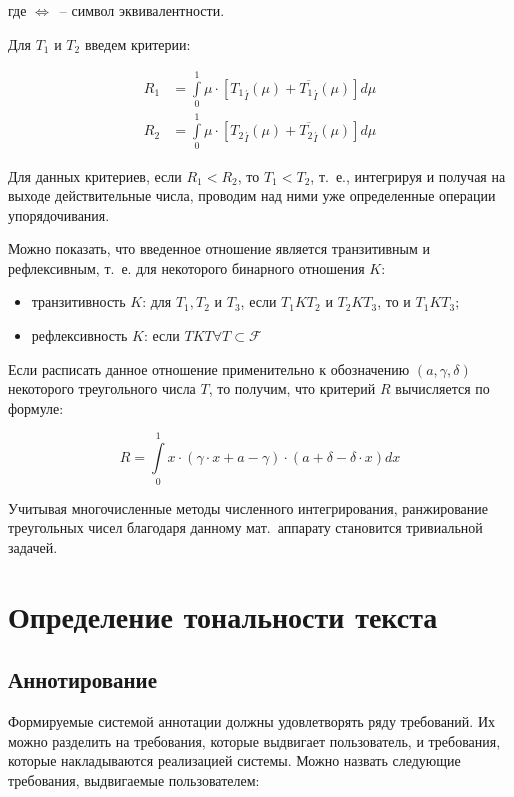 \documentclass[a4paper,14pt,russian]{extreport}
\begin{document}
где $\Leftrightarrow$~-- символ эквивалентности.

Для $T_1$ и $T_2$ введем критерии:

\begin{equation}
\begin{aligned}
R_1 &= \int\limits_0^1 \mu\cdot\left[{T_1}_{\stackrel{'}I}\left(\mu\right)+\overline{{T_1}_{\stackrel{'}I}}\left(\mu\right)\right] d\mu \\
R_2 &= \int\limits_0^1 \mu\cdot\left[{T_2}_{\stackrel{'}I}\left(\mu\right)+\overline{{T_2}_{\stackrel{'}I}}\left(\mu\right)\right] d\mu
\end{aligned}
\end{equation}

Для данных критериев, если $R_1<R_2$, то $T_1<T_2$, т.~е., интегрируя и получая на выходе действительные числа, проводим над ними уже определенные операции упорядочивания.

Можно показать, что введенное отношение является транзитивным и рефлексивным, т.~е. для некоторого бинарного отношения $K$:
\begin{itemize}
\item транзитивность $K$: для $T_1,T_2$ и $T_3$, если $T_1 K T_2$ и $T_2 K T_3$, то и $T_1 K T_3$;
\item рефлексивность $K$: если $T K T \forall T\subset \mathcal{F}$
\end{itemize}

Если расписать данное отношение применительно к обозначению $\left(a,\gamma,\delta\right)$ некоторого треугольного числа $T$, то получим, что критерий $R$ вычисляется по формуле:

\begin{equation}
R=\int\limits_0^1 x\cdot\left(\gamma\cdot x+a-\gamma\right)\cdot\left(a+\delta-\delta\cdot x\right) dx
\end{equation}

Учитывая многочисленные методы численного интегрирования, ранжирование треугольных чисел благодаря данному мат.~аппарату становится тривиальной задачей.
\section{Определение тональности текста}
\subsection{Аннотирование}

Формируемые системой аннотации должны удовлетворять ряду требований. Их можно разделить на требования, которые выдвигает пользователь, и требования, которые накладываются реализацией системы. Можно назвать следующие требования, выдвигаемые пользователем:
\end{document}
